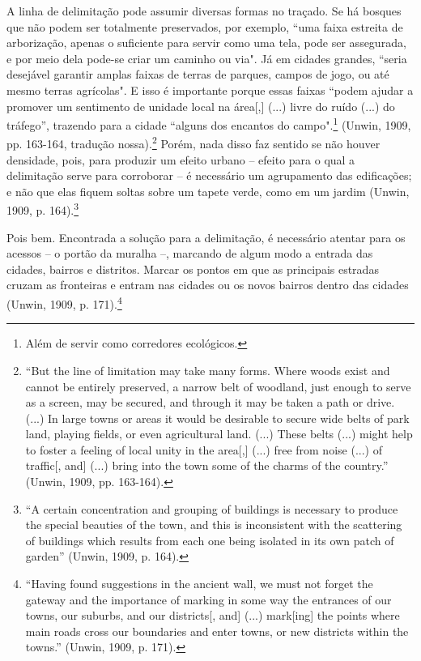 \documentclass[12pt, a4paper]{book} %
\begin{document}
        A linha de delimitação pode assumir diversas formas no traçado. Se há bosques que não podem ser totalmente preservados, por exemplo, ``uma faixa estreita de arborização, apenas o suficiente para servir como uma tela, pode ser assegurada, e por meio dela pode-se criar um caminho ou via". Já em cidades grandes, ``seria desejável garantir amplas faixas de terras de parques, campos de jogo, ou até mesmo terras agrícolas". E isso é importante porque essas faixas ``podem ajudar a promover um sentimento de unidade local na área[,] (...) livre do ruído (...) do tráfego'', trazendo para a cidade ``alguns dos encantos do campo".\footnote[53]{Além de servir como corredores ecológicos.} (Unwin, 1909, pp. 163-164, tradução nossa).\footnote[54]{``But the line of limitation may take many forms. Where woods exist and cannot be entirely preserved, a narrow belt of woodland, just enough to serve as a screen, may be secured, and through it may be taken a path or drive. (...) In large towns or areas it would be desirable to secure wide belts of park land, playing fields, or even agricultural land. (...) These belts (...) might help to foster a feeling of local unity in the area[,] (...) free from noise (...) of traffic[, and] (...) bring into the town some of the charms of the country.'' (Unwin, 1909, pp. 163-164).} Porém, nada disso faz sentido se não houver densidade, pois, para produzir um efeito urbano – efeito para o qual a delimitação serve para corroborar – é necessário um agrupamento das edificações; e não que elas fiquem soltas sobre um tapete verde, como em um jardim (Unwin, 1909, p. 164).\footnote[55]{``A certain concentration and grouping of buildings is necessary to produce the special beauties of the town, and this is inconsistent with the scattering of buildings which results from each one being isolated in its own patch of garden'' (Unwin, 1909, p. 164).}

        Pois bem. Encontrada a solução para a delimitação, é necessário atentar para os acessos – o portão da muralha –, marcando de algum modo a entrada das cidades, bairros e distritos. Marcar os pontos em que as principais estradas cruzam as fronteiras e entram nas cidades ou os novos bairros dentro das cidades (Unwin, 1909, p. 171).\footnote[56]{``Having found suggestions in the ancient wall, we must not forget the gateway and the importance of marking in some way the entrances of our towns, our suburbs, and our districts[, and] (...) mark[ing] the points where main roads cross our boundaries and enter towns, or new districts within the towns.'' (Unwin, 1909, p. 171).}
\end{document}
